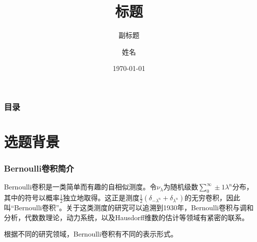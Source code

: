 \documentclass{beamer}
\title[开题答辩]{标题} %
\subtitle{副标题}
\author{姓名}
\institute[HUST]{华中科技大学}
\date{\today}
\numberwithin{equation}{section}
\theoremstyle{definition} \newtheorem{law}[thm]{Law}
\theoremstyle{plain} \newtheorem{jury}[thm]{Jury}
\theoremstyle{remark} \newtheorem*{marg}{Margaret}
\newcommand{\pmone}{\pm1}
\begin{document}
\begin{frame}
	\titlepage %
\end{frame}


\begin{frame}
	\frametitle{目录} %
	\tableofcontents %
\end{frame}


\section{选题背景} %


\begin{frame}
	\frametitle{Bernoulli卷积简介}\small
	Bernoulli卷积是一类简单而有趣的自相似测度。令$ \nu_{\lambda} $为随机级数$ \sum_{0}^{\infty} \pmone\lambda^{n} $分布，其中的符号以概率$ \frac{1}{2} $独立地取得。这正是测度$ \frac{1}{2}(\delta_{-\lambda^{n}}+\delta_{\lambda^{n}}) $的无穷卷积，因此叫``Bernoulli卷积''。关于这类测度的研究可以追溯到1930年，Bernoulli卷积与调和分析，代数数理论，动力系统，以及Hausdorff维数的估计等领域有紧密的联系。


	根据不同的研究领域，Bernoulli卷积有不同的表示形式。\cite{Sixtyyears}

\end{frame}
\end{document}
